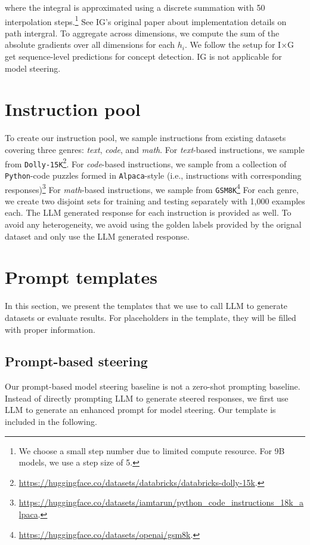 \documentclass{article}
\theoremstyle{plain}
\theoremstyle{definition}
\theoremstyle{remark}
\begin{document}
where the integral is approximated using a discrete summation with 50 interpolation steps.\footnote{We choose a small step number due to limited compute resource. For 9B models, we use a step size of 5.} See IG's original paper about implementation details on path intergral. To aggregate across dimensions, we compute the sum of the absolute gradients over all dimensions for each \(h_i\). We follow the setup for I$\times$G get sequence-level predictions for concept detection. IG is not applicable for model steering.

\section{Instruction pool}\label{sec:instruction_pool}
To create our instruction pool, we sample instructions from existing datasets covering three genres: \textit{text}, \textit{code}, and \textit{math}. For \textit{text}-based instructions, we sample from \texttt{Dolly-15K}\footnote{\url{https://huggingface.co/datasets/databricks/databricks-dolly-15k}.}. For \textit{code}-based instructions, we sample from a collection of \texttt{Python}-code puzzles formed in \texttt{Alpaca}-style (i.e., instructions with corresponding responses)\footnote{\url{https://huggingface.co/datasets/iamtarun/python_code_instructions_18k_alpaca}.} For \textit{math}-based instructions, we sample from \texttt{GSM8K}\footnote{\url{https://huggingface.co/datasets/openai/gsm8k}.} For each genre, we create two disjoint sets for training and testing separately with 1,000 examples each. The LLM generated response for each instruction is provided as well. To avoid any heterogeneity, we avoid using the golden labels provided by the orignal dataset and only use the LLM generated response.



\section{Prompt templates}\label{sec:prompt_templates}
In this section, we present the templates that we use to call LLM to generate datasets or evaluate results. For placeholders in the template, they will be filled with proper information.

\subsection{Prompt-based steering}\label{sec:prompt-steering-template}
Our prompt-based model steering baseline is not a zero-shot prompting baseline.
Instead of directly prompting LLM to generate steered responses, we first use LLM to generate an enhanced prompt for model steering. Our template is included in the following. 
\end{document}
